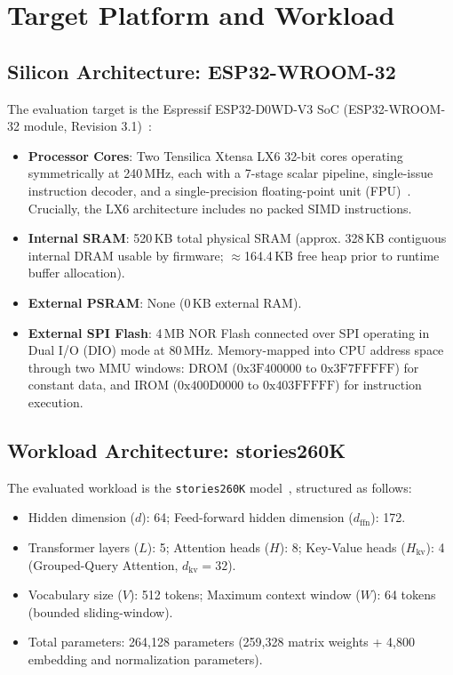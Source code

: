 \documentclass[10pt,a4paper]{article}
\begin{document}
\section{Target Platform and Workload}
\label{sec:platform}

\subsection{Silicon Architecture: ESP32-WROOM-32}
The evaluation target is the Espressif ESP32-D0WD-V3 SoC (ESP32-WROOM-32 module, Revision 3.1)~\cite{espressif2024esp32datasheet}:
\begin{itemize}
    \item \textbf{Processor Cores}: Two Tensilica Xtensa LX6 32-bit cores operating symmetrically at 240\,MHz, each with a 7-stage scalar pipeline, single-issue instruction decoder, and a single-precision floating-point unit (FPU)~\cite{cadence2017xtensa}. Crucially, the LX6 architecture includes no packed SIMD instructions.
    \item \textbf{Internal SRAM}: 520\,KB total physical SRAM (approx. 328\,KB contiguous internal DRAM usable by firmware; $\approx$164.4\,KB free heap prior to runtime buffer allocation).
    \item \textbf{External PSRAM}: None (0\,KB external RAM).
    \item \textbf{External SPI Flash}: 4\,MB NOR Flash connected over SPI operating in Dual I/O (DIO) mode at 80\,MHz. Memory-mapped into CPU address space through two MMU windows: DROM ($0\text{x}3\text{F}400000$ to $0\text{x}3\text{F}7\text{FFFFF}$) for constant data, and IROM ($0\text{x}400\text{D}0000$ to $0\text{x}403\text{FFFFF}$) for instruction execution.
\end{itemize}

\subsection{Workload Architecture: stories260K}
The evaluated workload is the \texttt{stories260K} model~\cite{karpathy2023llama2c,eldan2023tinystories}, structured as follows:
\begin{itemize}
    \item Hidden dimension ($d$): 64; Feed-forward hidden dimension ($d_{\text{ffn}}$): 172.
    \item Transformer layers ($L$): 5; Attention heads ($H$): 8; Key-Value heads ($H_{\text{kv}}$): 4 (Grouped-Query Attention, $d_{\text{kv}} = 32$).
    \item Vocabulary size ($V$): 512 tokens; Maximum context window ($W$): 64 tokens (bounded sliding-window).
    \item Total parameters: 264,128 parameters (259,328 matrix weights + 4,800 embedding and normalization parameters).
\end{itemize}
\end{document}

